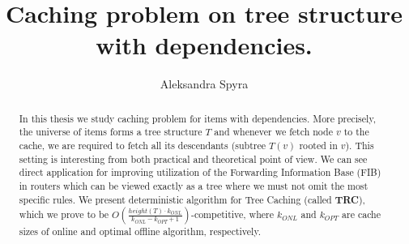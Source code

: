 \documentclass[a4paper,10pt]{article}
\title{Caching problem on tree structure with dependencies.}
\author{Aleksandra Spyra}
\begin{document}
\maketitle

\begin{abstract}
In this thesis we study caching problem for items with dependencies.
More precisely, the universe of items forms a tree structure $T$ and whenever
we fetch node $v$ to the cache, we are required to fetch all its descendants
(subtree $T(v)$ rooted in $v$). This setting is interesting from both practical 
and theoretical point of view. We can see direct application for improving 
utilization of the Forwarding Information Base (FIB) in routers which can be 
viewed exactly as a tree where we must not omit the most specific rules. We 
present deterministic algorithm for Tree Caching (called \textbf{TRC}), which 
we 
prove to be $O(\frac{height(T) \cdot k_{ONL}}{k_{ONL} - k_{OPT} + 
1})$-competitive, 
where $k_{ONL}$ and $k_{OPT}$ are cache sizes of online and optimal offline 
algorithm, respectively. 
\end{abstract}

\tableofcontents




\printbibliography
\end{document}
